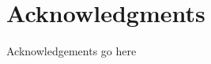 \newpage
\thispagestyle{headings}
\mbox{}

\newpage
\thispagestyle{headings}
\mbox{}

\section*{Acknowledgments}
Acknowledgements go here
